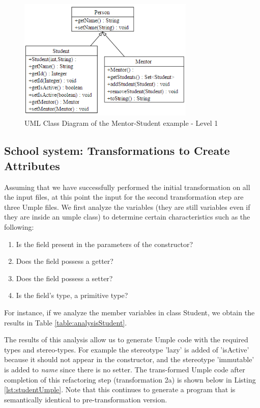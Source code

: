 \begin{figure}[h]
\centering
\includegraphics[width=0.75\textwidth]{Figures/Example1a1.png} 
\caption{UML Class Diagram of the Mentor-Student example - Level 1}
\label{fig:Example1a1}
\end{figure}

\subsection{School system: Transformations to Create Attributes}

Assuming that we have successfully performed the initial transformation on all the input files, at this point the input for the second transformation step are three Umple files.
We first analyze the variables (they are still variables even if they are inside an umple class) to determine certain characteristics such as the following:

\begin{enumerate}
\item Is the field present in the parameters of the constructor?
\item Does the field possess a getter?
\item Does the field possess a setter?
\item Is the field's type, a primitive type?
\end{enumerate}

For instance, if we analyze the member variables in class Student, we obtain the results in Table \ref{table:analysisStudent}.

The results of this analysis allow us to generate Umple code with the required types and stereo-types. For example the stereotype 'lazy' is added of 'isActive' because it should not appear in the constructor, and the stereotype 'immutable' is added to \textit{name} since there is no setter. The trans-formed Umple code after completion of this refactoring step (transformation 2a) is shown below in Listing \ref{lst:studentUmple}. Note that this continues to generate a program that is semantically identical to pre-transformation version.


